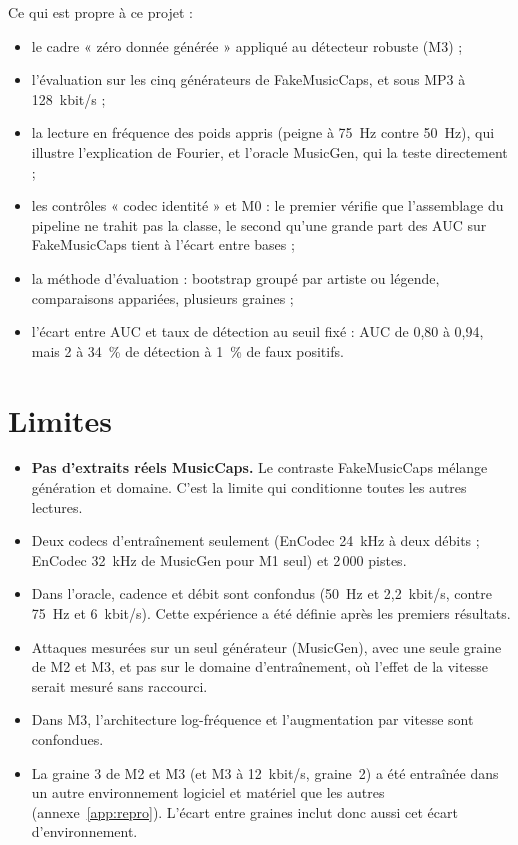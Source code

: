 \documentclass[a4paper, 11pt]{article}
\begin{document}
Ce qui est propre à ce projet :
\begin{itemize}
    \item le cadre « zéro donnée générée » appliqué au détecteur robuste (M3) ;
    \item l'évaluation sur les cinq générateurs de FakeMusicCaps, et sous MP3 à 128~kbit/s ;
    \item la lecture en fréquence des poids appris (peigne à 75~Hz contre 50~Hz), qui illustre l'explication
    de Fourier, et l'oracle MusicGen, qui la teste directement ;
    \item les contrôles « codec identité » et M0 : le premier vérifie que l'assemblage du pipeline ne trahit
    pas la classe, le second
    qu'une grande part des AUC sur FakeMusicCaps tient à l'écart entre bases ;
    \item la méthode d'évaluation : bootstrap groupé par artiste ou légende, comparaisons appariées, plusieurs
    graines ;
    \item l'écart entre AUC et taux de détection au seuil fixé : AUC de 0,80 à 0,94, mais 2 à 34~\% de
    détection à 1~\% de faux positifs.
\end{itemize}

\section{Limites}
\label{sec:limites}

\begin{itemize}
    \item \textbf{Pas d'extraits réels MusicCaps.} Le contraste FakeMusicCaps mélange génération et domaine.
    C'est la limite qui conditionne toutes les autres lectures.
    \item Deux codecs d'entraînement seulement (EnCodec 24~kHz à deux débits ; EnCodec 32~kHz de MusicGen pour
    M1 seul) et 2\,000 pistes.
    \item Dans l'oracle, cadence et débit sont confondus (50~Hz et 2,2~kbit/s, contre 75~Hz et 6~kbit/s). Cette
    expérience a été définie après les premiers résultats.
    \item Attaques mesurées sur un seul générateur (MusicGen), avec une seule graine de M2 et M3, et pas sur le
    domaine d'entraînement, où l'effet de la vitesse serait mesuré sans raccourci.
    \item Dans M3, l'architecture log-fréquence et l'augmentation par vitesse sont confondues.
    \item La graine 3 de M2 et M3 (et M3 à 12~kbit/s, graine~2) a été entraînée dans un autre environnement
    logiciel et matériel que les autres (annexe~\ref{app:repro}). L'écart entre graines inclut donc aussi cet
    écart d'environnement.
\end{itemize}
\end{document}
